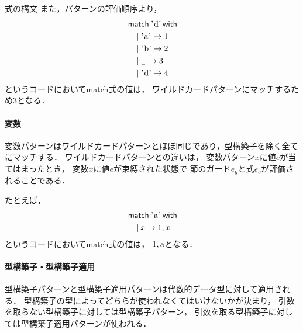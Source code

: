 \documentclass[a4paper,titlepage,report,disablejfam]{jsbook}
\begin{document}
\begin{resbonsiblesection}{式の構文}{\sakamoto}
また，パターンの評価順序より，
\begin{equation}
\begin{aligned}
&\mathnkop{match}\text{\lstinline|'d'|}\mathnkop{with} \\
&\quad \clauseor \text{\lstinline|'a'|}\rightarrow 1 \\
&\quad \clauseor \text{\lstinline|'b'|}\rightarrow 2 \\
&\quad \clauseor \patternany \rightarrow 3 \\
&\quad \clauseor \text{\lstinline|'d'|}\rightarrow 4
\end{aligned}
\end{equation}
というコードにおいてmatch式の値は，
ワイルドカードパターンにマッチするため$3$となる．

\paragraph{変数}
変数パターンはワイルドカードパターンとほぼ同じであり，型構築子を除く全てにマッチする．
ワイルドカードパターンとの違いは，
変数パターン$x$に値$e$が当てはまったとき，
変数$x$に値$e$が束縛された状態で
節のガード$e_g$と式$e_c$が評価されることである．

たとえば，
\begin{equation}
\begin{aligned}
&\mathnkop{match}\text{\lstinline|'a'|}\mathnkop{with} \\
&\quad \clauseor x\rightarrow 1,x \\
\end{aligned}
\end{equation}
というコードにおいてmatch式の値は，
$1,\text{\lstinline|a|}$となる．

\paragraph{型構築子・型構築子適用}
型構築子パターンと型構築子適用パターンは代数的データ型に対して適用される．
型構築子の型によってどちらが使われなくてはいけないかが決まり，
引数を取らない型構築子に対しては型構築子パターン，
引数を取る型構築子に対しては型構築子適用パターンが使われる．


\end{resbonsiblesection}
\end{document}
